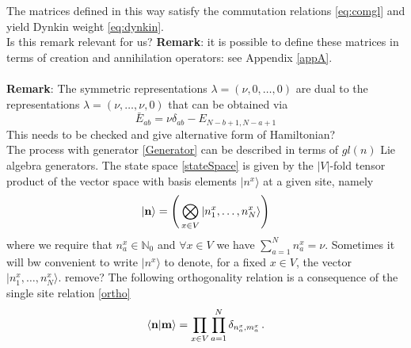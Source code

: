 \documentclass[10pt]{article}
\numberwithin{equation}{section}
\numberwithin{equation}{subsection}
\newcommand{\twoj}{\nu}
\begin{document}
The matrices defined in this way satisfy the commutation relations \eqref{eq:comgl} and yield Dynkin weight \eqref{eq:dynkin}. \\
{\color{red} Is this remark relevant for us?}
\newline 
\textbf{Remark}: it is possible to define these matrices in terms of creation and annihilation operators: see Appendix \ref{appA}.
\\ \\
\textbf{Remark}: The symmetric representations $\lambda=(\twoj,0,\ldots,0)$ are dual to the representations $\lambda=(\twoj,\ldots,\twoj,0)$ that can be obtained via 
\begin{equation}
   \bar E_{ab}=\nu\delta_{ab}-E_{N-b+1,N-a+1}
\end{equation}
{\color{red} This needs to be checked and give alternative form of Hamiltonian?}\\
The process with generator \eqref{Generator} can be described in terms of $gl(n)$ Lie algebra generators. The state space \eqref{stateSpace} is given by the $|V|$-fold tensor product of the vector space with basis elements $|n^x\rangle$ at a given site, namely
\begin{equation}
|{\bf n}\rangle=\left(\,\bigotimes_{x\in V}	|n_{1}^{x},\ldots,n_{N}^{x}\rangle\right)
\end{equation}
{\color{blue}
where we require that $n_{a}^{x}\in \mathbb{N}_{0}$ and $\forall x\in V$ we have $\sum_{a=1}^{N}n_{a}^{x}=\nu$. Sometimes it will bw convenient to write $|n^{x}\rangle$ to denote, for a fixed $x\in V$, the vector $|n_{1}^{x},\ldots,n_{N}^{x}\rangle$.}
{\color{red}remove?}
The following orthogonality relation is a consequence of the single site relation \eqref{ortho}
\begin{equation}
    \langle {\bf n}|{\bf m}\rangle =\prod_{x\in V}\prod_{a=1}^N\delta_{n^x_a,m^{x}_a}\,.
\end{equation}
\end{document}
